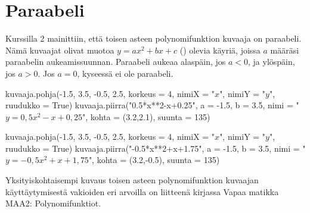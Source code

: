 \section{Paraabeli}



Kurssilla 2 mainittiin, että toisen asteen polynomifunktion kuvaaja on paraabeli. Nämä kuvaajat olivat muotoa $y=ax^2+bx+c$ () olevia käyriä, joissa $a$ määräsi paraabelin aukeamissuunnan. Paraabeli aukeaa alaspäin, jos $a<0$, ja ylöspäin, jos $a>0$. Jos $a=0$, kyseessä ei ole paraabeli.

\begin{kuva}
    kuvaaja.pohja(-1.5, 3.5, -0.5, 2.5, korkeus = 4, nimiX = "$x$", nimiY = "$y$", ruudukko = True)
    kuvaaja.piirra("0.5*x**2-x+0.25", a = -1.5, b = 3.5, nimi = "$y= 0,5x^2-x+0,25$", kohta = (3.2,2.1), suunta = 135)
\end{kuva}

\begin{kuva}
    kuvaaja.pohja(-1.5, 3.5, -0.5, 2.5, korkeus = 4, nimiX = "$x$", nimiY = "$y$", ruudukko = True)
    kuvaaja.piirra("-0.5*x**2+x+1.75", a = -1.5, b = 3.5, nimi = "$y= -0,5x^2+x+1,75$", kohta = (3.2,-0.5), suunta = 135)
\end{kuva}

Yksityiskohtaisempi kuvaus toisen asteen polynomifunktion kuvaajan käyttäytymisestä vakioiden eri arvoilla on liitteenä kirjassa Vapaa matikka MAA2: Polynomifunktiot.

